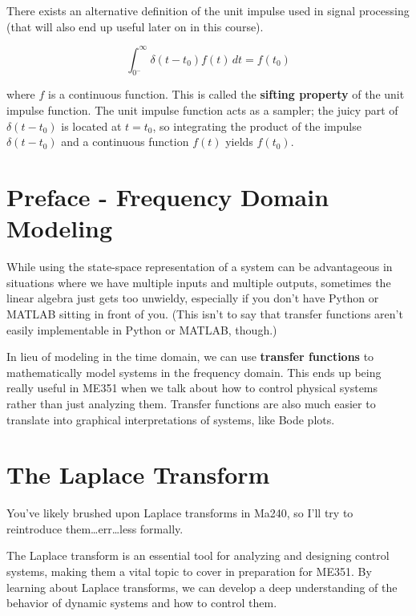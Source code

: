 \documentclass{report}
\begin{document}
\begin{onehalfspacing}
\begin{flushleft}
\medskip

There exists an alternative definition of the unit impulse used in signal processing (that will also end up useful later on in this course).

\vspace{-0.1in}
\[\int_{0^-}^\infty \delta(t-t_0) f(t)\, dt = f(t_0)\]

where \(f\) is a continuous function. This is called the \textbf{sifting property} of the unit impulse function. The unit impulse function acts as a sampler; the juicy part of \(\delta(t-t_0)\) is located at \(t=t_0\), so integrating the product of the impulse \(\delta(t-t_0)\) and a continuous function \(f(t)\) yields \(f(t_0)\).

\section*{Preface - Frequency Domain Modeling}

While using the state-space representation of a system can be advantageous in situations where we have multiple inputs and multiple outputs, sometimes the linear algebra just gets too unwieldy, especially if you don't have Python or MATLAB sitting in front of you. (This isn't to say that transfer functions aren't easily implementable in Python or MATLAB, though.)

\medskip

In lieu of modeling in the time domain, we can use \textbf{transfer functions} to mathematically model systems in the frequency domain. This ends up being really useful in ME351 when we talk about how to control physical systems rather than just analyzing them. Transfer functions are also much easier to translate into graphical interpretations of systems, like Bode plots.

\section{The Laplace Transform}

You've likely brushed upon Laplace transforms in Ma240, so I'll try to reintroduce them\dots err\dots less formally.

\medskip

The Laplace transform is an essential tool for analyzing and designing control systems, making them a vital topic to cover in preparation for ME351. By learning about Laplace transforms, we can develop a deep understanding of the behavior of dynamic systems and how to control them.


\end{flushleft}
\end{onehalfspacing}
\end{document}
